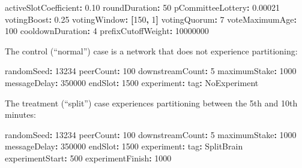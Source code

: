 \documentclass[10pt]{article}
\newenvironment{Shaded}{}{}
\newcommand{\AttributeTok}[1]{\textcolor[rgb]{0.49,0.56,0.16}{#1}}
\newcommand{\DecValTok}[1]{\textcolor[rgb]{0.25,0.63,0.44}{#1}}
\newcommand{\FloatTok}[1]{\textcolor[rgb]{0.25,0.63,0.44}{#1}}
\newcommand{\FunctionTok}[1]{\textcolor[rgb]{0.02,0.16,0.49}{#1}}
\newcommand{\KeywordTok}[1]{\textcolor[rgb]{0.00,0.44,0.13}{\textbf{#1}}}
\begin{document}
\begin{Shaded}
\begin{Highlighting}[]

\FunctionTok{activeSlotCoefficient}\KeywordTok{:}\AttributeTok{ }\FloatTok{0.10}
\FunctionTok{roundDuration}\KeywordTok{:}\AttributeTok{ }\DecValTok{50}
\FunctionTok{pCommitteeLottery}\KeywordTok{:}\AttributeTok{ }\FloatTok{0.00021}
\FunctionTok{votingBoost}\KeywordTok{:}\AttributeTok{ }\FloatTok{0.25}
\FunctionTok{votingWindow}\KeywordTok{:}\AttributeTok{ }\KeywordTok{[}\DecValTok{150}\KeywordTok{,}\AttributeTok{ }\DecValTok{1}\KeywordTok{]}
\FunctionTok{votingQuorum}\KeywordTok{:}\AttributeTok{ }\DecValTok{7}
\FunctionTok{voteMaximumAge}\KeywordTok{:}\AttributeTok{ }\DecValTok{100}
\FunctionTok{cooldownDuration}\KeywordTok{:}\AttributeTok{ }\DecValTok{4}
\FunctionTok{prefixCutoffWeight}\KeywordTok{:}\AttributeTok{  }\DecValTok{10000000}
\end{Highlighting}
\end{Shaded}

The control (``normal'') case is a network that does not experience
partitioning:

\begin{Shaded}
\begin{Highlighting}[]
\FunctionTok{randomSeed}\KeywordTok{:}\AttributeTok{ }\DecValTok{13234}
\FunctionTok{peerCount}\KeywordTok{:}\AttributeTok{ }\DecValTok{100}
\FunctionTok{downstreamCount}\KeywordTok{:}\AttributeTok{ }\DecValTok{5}
\FunctionTok{maximumStake}\KeywordTok{:}\AttributeTok{ }\DecValTok{1000}
\FunctionTok{messageDelay}\KeywordTok{:}\AttributeTok{ }\DecValTok{350000}
\FunctionTok{endSlot}\KeywordTok{:}\AttributeTok{ }\DecValTok{1500}
\FunctionTok{experiment}\KeywordTok{:}
\AttributeTok{  }\FunctionTok{tag}\KeywordTok{:}\AttributeTok{ NoExperiment}
\end{Highlighting}
\end{Shaded}

The treatment (``split'') case experiences partitioning between the 5th
and 10th minutes:

\begin{Shaded}
\begin{Highlighting}[]
\FunctionTok{randomSeed}\KeywordTok{:}\AttributeTok{ }\DecValTok{13234}
\FunctionTok{peerCount}\KeywordTok{:}\AttributeTok{ }\DecValTok{100}
\FunctionTok{downstreamCount}\KeywordTok{:}\AttributeTok{ }\DecValTok{5}
\FunctionTok{maximumStake}\KeywordTok{:}\AttributeTok{ }\DecValTok{1000}
\FunctionTok{messageDelay}\KeywordTok{:}\AttributeTok{ }\DecValTok{350000}
\FunctionTok{endSlot}\KeywordTok{:}\AttributeTok{ }\DecValTok{1500}
\FunctionTok{experiment}\KeywordTok{:}
\AttributeTok{  }\FunctionTok{tag}\KeywordTok{:}\AttributeTok{ SplitBrain}
\AttributeTok{  }\FunctionTok{experimentStart}\KeywordTok{:}\AttributeTok{ }\DecValTok{500}
\AttributeTok{  }\FunctionTok{experimentFinish}\KeywordTok{:}\AttributeTok{ }\DecValTok{1000}
\end{Highlighting}
\end{Shaded}
\end{document}
